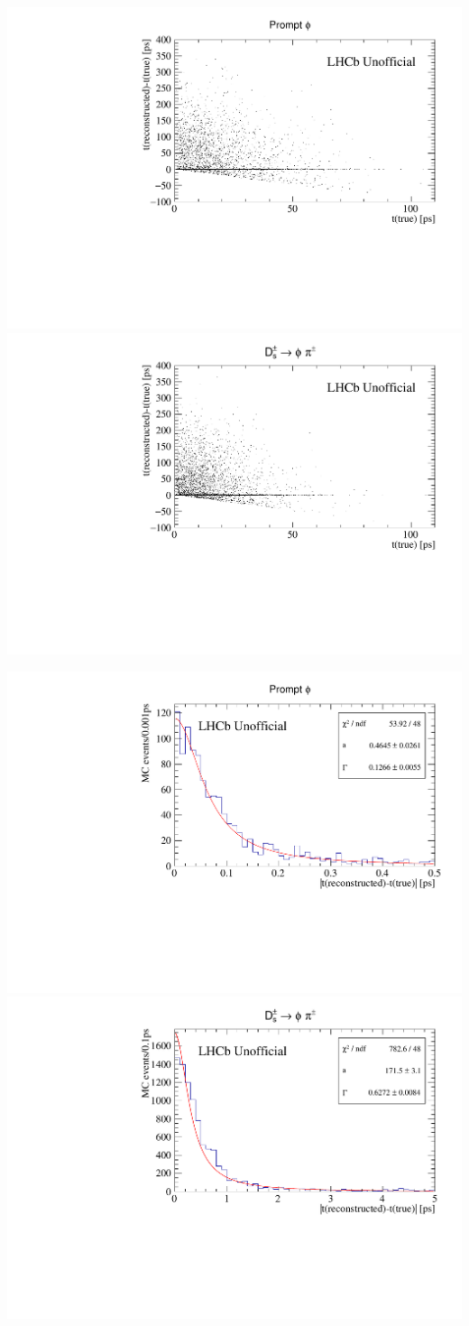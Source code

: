 \begin{center}
\includegraphics[width=.49\textwidth]{figs/time_res_incl/LL-DTF.pdf}
\includegraphics[width=.49\textwidth]{figs/time_res_Ds/LL-DTF.pdf}
\label{FIG:LL-DTF}


\includegraphics[width=.49\textwidth]{figs/time_res_incl/timeResolution-LL-DTF.pdf}
\includegraphics[width=.49\textwidth]{figs/time_res_Ds/timeResolution-LL-DTF.pdf}
\label{FIG:timeres-LL-DTF}



\end{center}
